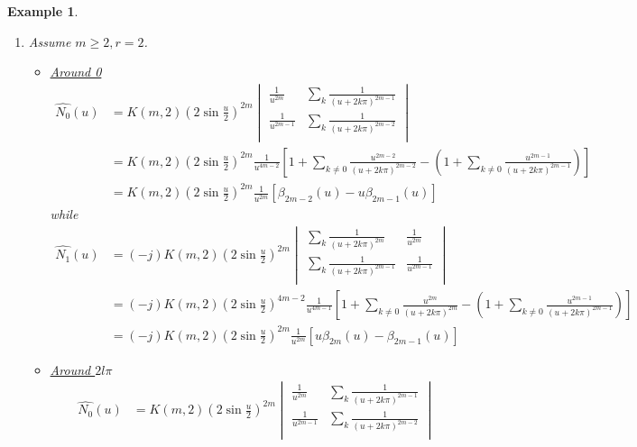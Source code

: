 \documentclass[a4paper, 11pt]{article}
\newtheorem{example}{Example}
\begin{document}
\begin{example}
\begin{enumerate}
    \item Assume $m \geq 2, r=2$.
      \begin{itemize}
	\item \underline{Around 0}
	  \begin{align*}
	    \hat{N_0}(u) &= K(m,2) {\left(2 \sin \frac{u}{2} \right)}^{2m}   
	      \begin{vmatrix}
		\frac{1}{u^{2m}} & \sum_{k} \frac{1}{{(u+2k\pi)}^{2m-1}} \\
		\frac{1}{u^{2m-1}} & \sum_{k} \frac{1}{{(u+2k\pi)}^{2m-2}} \\
	      \end{vmatrix} \\
	      &=  K(m,2) {\left(2 \sin \frac{u}{2} \right)}^{2m} \frac{1}{u^{4m-2}} \left[ 1+ \sum_{k \neq 0} 
	      \frac{u^{2m-2}}{{(u+2k\pi)}^{2m-2}} - (1+ \sum_{k \neq 0} \frac{u^{2m-1}}{{(u+2k\pi)}^{2m-1}})  \right] \\
	      &=  K(m,2) {\left(2 \sin \frac{u}{2} \right)}^{2m} \frac{1}{u^{2m}}\left[\beta_{2m-2}(u) - u 
	      \beta_{2m-1}(u) \right]
	    \end{align*}
	    while
	    \begin{align*}
	      \hat{N_1}(u) &= (-j)K(m,2) {\left(2 \sin \frac{u}{2} \right)}^{2m}   
	      \begin{vmatrix}
		\sum_{k} \frac{1}{{(u+2k\pi)}^{2m}} & \frac{1}{u^{2m}}  \\
		\sum_{k} \frac{1}{{(u+2k\pi)}^{2m-1}} & \frac{1}{u^{2m-1}}  \\
	      \end{vmatrix} \\
	      &=  (-j)K(m,2) {\left(2 \sin \frac{u}{2} \right)}^{4m-2} \frac{1}{u^{4m-1}}\left[ 1+ \sum_{k \neq 0} 
	      \frac{u^{2m}}{{(u+2k\pi)}^{2m}} - (1+ \sum_{k \neq 0} \frac{u^{2m-1}}{{(u+2k\pi)}^{2m-1}})  \right] \\
	      &=  (-j)K(m,2) {\left(2 \sin \frac{u}{2} \right)}^{2m} \frac{1}{u^{2m}}\left[u\beta_{2m}(u) - 
	    \beta_{2m-1}(u) \right]
	  \end{align*}
	\item \underline{Around $2l\pi$}
	  \begin{align*}
	    \hat{N_0}(u) &= K(m,2) {\left(2 \sin \frac{u}{2} \right)}^{2m}   \begin{vmatrix}
		\frac{1}{u^{2m}} & \sum_{k} \frac{1}{{(u+2k\pi)}^{2m-1}} \\
		\frac{1}{u^{2m-1}} & \sum_{k} \frac{1}{{(u+2k\pi)}^{2m-2}} \\
	      \end{vmatrix} \\

\end{align*}
\end{itemize}
\end{enumerate}
\end{example}
\end{document}
